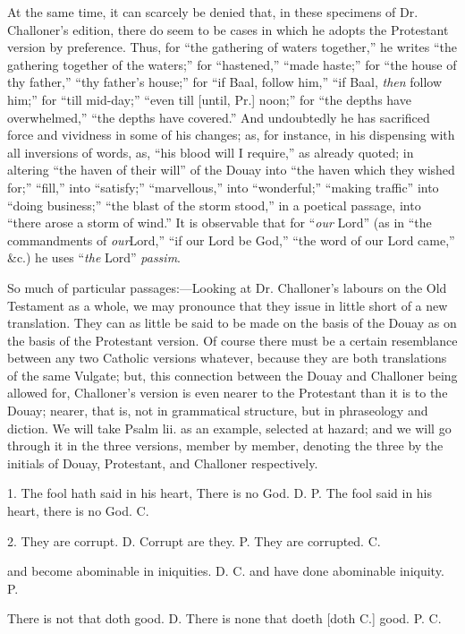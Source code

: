 At the same time, it can scarcely be denied that, in these
specimens of Dr. Challoner's edition, there do seem to be cases in
which he adopts the Protestant version by preference. Thus, for
``the gathering of waters together,'' he writes ``the
gathering together of the waters;'' for ``hastened,''
``made haste;'' for ``the house of thy father,''
``thy father's house;'' for ``if Baal, follow him,''
``if Baal, \emph{then} follow him;'' for ``till
mid-day;'' ``even till [until, Pr.] noon;'' for ``the
depths have overwhelmed,'' ``the depths have covered.''
And undoubtedly he has sacrificed force and vividness in some of his
changes; as, for instance, in his dispensing with all inversions of
words, as, ``his blood will I require,'' as already quoted; in
altering ``the haven of their will'' of the Douay into
``the haven which they wished for;'' ``fill,'' into
``satisfy;'' ``marvellous,'' into
``wonderful;'' ``making traffic'' into ``doing
business;'' ``the blast of the storm stood,'' in a
poetical passage, into ``there arose a storm of wind.'' It is
observable that for ``\emph{our} Lord'' (as in ``the
commandments of \emph{our}Lord,'' ``if our Lord be God,''
``the word of our Lord came,'' \&c.) he uses ``\emph{the}
Lord'' \emph{passim}.

So much of particular passages:—Looking at Dr. Challoner's
labours on the Old Testament as a whole, we may pronounce that they
issue in little short of a new translation. They can as little be said
to be made on the basis of the Douay as on the basis of the Protestant
version. Of course there must be a certain resemblance between any two
Catholic versions whatever, because they are both translations of the
same Vulgate; but, this connection between the Douay and Challoner
being allowed for, Challoner's version is even nearer to the
Protestant than it is to the Douay; nearer, that is, not in
grammatical structure, but in phraseology and diction. We will take
Psalm lii. as an example, selected at hazard; and we will go through
it in the three versions, member by member, denoting the three by the
initials of Douay, Protestant, and Challoner respectively.

1. The fool hath said in his heart, There is no God. D. P. The fool
said in his heart, there is no God. C.

2. They are corrupt. D. Corrupt are they. P. They are corrupted. C.

and become abominable in iniquities. D. C. and have done abominable
iniquity. P.

There is not that doth good. D. There is none that doeth [doth C.]
good. P. C.

